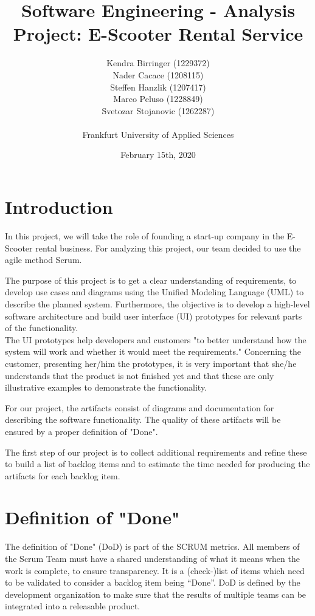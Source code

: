 \documentclass[a4paper, 12pt]{article}
\title{Software Engineering - Analysis\\
Project: E-Scooter Rental Service}
\author{
    Kendra Birringer (1229372)\\
    Nader Cacace (1208115)\\
    Steffen Hanzlik (1207417)\\
    Marco Peluso (1228849)\\
    Svetozar Stojanovic (1262287)\\
    \\
    Frankfurt University of Applied Sciences
}
\date{February 15th, 2020}
\begin{document}
\maketitle
\newpage
\tableofcontents

\newpage
\section{Introduction}
In this project, we will take the role of founding a start-up company in the E-Scooter rental business.
For analyzing this project, our team decided to use the agile method Scrum.

The purpose of this project is to get a clear understanding of requirements, to develop use cases and diagrams using the Unified Modeling Language (UML) to describe the planned system.
Furthermore, the objective is to develop a high-level software architecture and build user interface (UI) prototypes for relevant parts of the functionality.\\ 
The UI prototypes help developers and customers "to better understand how the system will work and whether it would meet the requirements." \cite{thoma} 
Concerning the customer, presenting her/him the prototypes, it is very important that she/he understands that the product is not finished yet and that these are only illustrative examples to demonstrate the functionality.

For our project, the artifacts consist of diagrams and documentation for describing the software functionality. The quality of these artifacts will be ensured by a proper definition of "Done".

The first step of our project is to collect additional requirements and refine these to build a list of backlog items and to estimate the time needed for producing the artifacts for each backlog item.

\section{Definition of "Done"}
The definition of "Done" (DoD) is part of the SCRUM metrics. All members of the Scrum Team must have a shared understanding of what it means when the work is complete, to ensure transparency. \cite{scrumguide}
It is a (check-)list of items which need to be validated to consider a backlog item being “Done”. DoD is defined by the development organization to make sure that the results of multiple teams can be integrated into a releasable product. \cite{thoma1}
\end{document}
